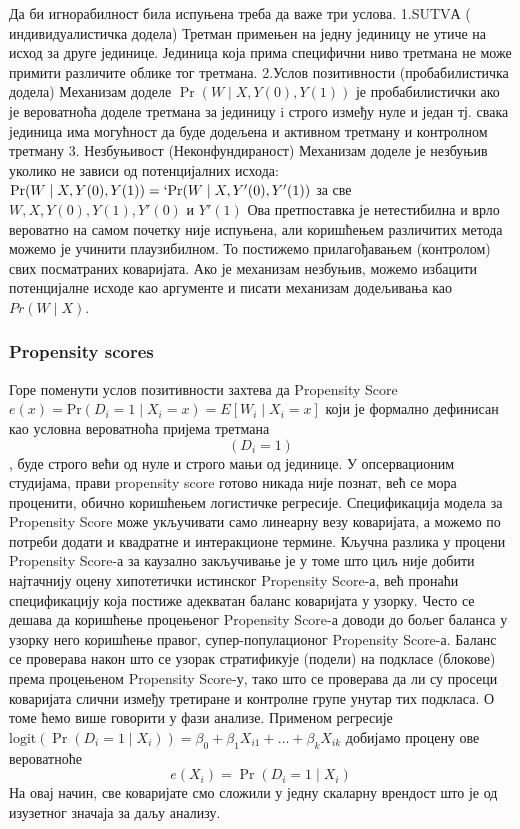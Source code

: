 \documentclass[12pt, a4paper]{article}
\begin{document}
Да би игнорабилност била испуњена треба да важе три услова.
1.SUTVА ( индивидуалистичка додела)
Третман примењен на једну јединицу не утиче на исход за друге јединице.
Јединица која прима специфични ниво третмана не може примити различите облике тог третмана.
2.Услов позитивности (пробабилистичка додела)
Механизам доделе $\Pr(W \mid X, Y(0), Y(1))$ је пробабилистички ако је вероватноћа доделе третмана за јединицу i строго између нуле и један тј. свака јединица има могућност да буде додељена и активном третману и контролном третману
3. Незбуњивост (Неконфундираност)
Механизам доделе је незбуњив уколико не зависи од потенцијалних исхода: $\text{Pr}(W \mid X, Y(0), Y(1)) =`\text{Pr}(W \mid X, Y'(0), Y'(1))$ за све $W, X, Y(0), Y(1), Y'(0)$ и $Y'(1)$
Ова претпоставка је нетестибилна и врло вероватно на самом почетку није испуњена, али коришћењем различитих метода можемо је учинити плаузибилном. То постижемо прилагођавањем (контролом) свих посматраних коваријата. Ако је механизам незбуњив, можемо избацити потенцијалне исходе као аргументе и писати механизам додељивања као  $Pr(W \mid X)$. 

\subsubsection{Propensity scores}
Горе поменути услов позитивности захтева да Propensity Score $e(x) = \text{Pr}(D_i = 1 \mid X_i = x) = E[W_i \mid X_i = x]$ који је формално дефинисан као условна вероватноћа пријема третмана $$(D_i=1)$$, буде строго већи од нуле и строго мањи од јединице.  У опсервационим студијама, прави propensity score готово никада није познат, већ се мора проценити, обично коришћењем логистичке регресије. Спецификација модела за Propensity Score може укључивати само линеарну везу коваријата, а можемо по потреби додати и квадратне и интеракционе термине. Кључна разлика у процени Propensity Score-а за каузално закључивање је у томе што циљ није добити најтачнију оцену хипотетички истинског Propensity Score-а, већ пронаћи спецификацију која постиже адекватан баланс коваријата у узорку. Често се дешава да коришћење процењеног Propensity Score-а доводи до бољег баланса у узорку него коришћење правог, супер-популационог Propensity Score-а.
Баланс се проверава након што се узорак стратификује (подели) на подкласе (блокове) према процењеном Propensity Score-у, тако што се проверава да ли су просеци коваријата слични између третиране и контролне групе унутар тих подкласа. О томе ћемо више говорити у фази анализе.
Применом регресије $\text{logit}(\Pr(D_i = 1 \mid X_i)) = \beta_0 + \beta_1 X_{i1} + \dots + \beta_k X_{ik}$ добијамо процену ове вероватноће \[
e(X_i) = \Pr(D_i = 1 \mid X_i)
\]
На овај начин, све коваријате смо сложили у једну скаларну врендост што је од изузетног значаја за даљу анализу.
\end{document}
